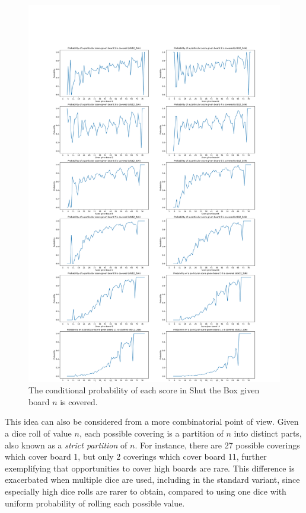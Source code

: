 \begin{figure}
    \centering
    \includegraphics[width=\textwidth]{images/ShutTheBox/stb12_2d6_score_given_board_12.pdf}
    \caption{The conditional probability of each score in Shut the Box given board $n$ is covered.}
\label{cs1:stb12_2d6_cond_prob}
\end{figure}

This idea can also be considered from a more combinatorial point of view. Given a dice roll of value $n$, each possible covering is a partition of $n$ into distinct parts, also known as a \emph{strict partition} of $n$. For instance, there are 27 possible coverings which cover board 1, but only 2 coverings which cover board 11, further exemplifying that opportunities to cover high boards are rare. This difference is exacerbated when multiple dice are used, including in the standard variant, since especially high dice rolls are rarer to obtain, compared to using one dice with uniform probability of rolling each possible value.


